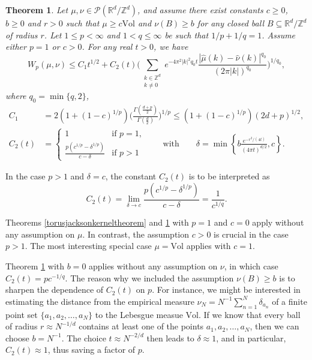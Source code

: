 \documentclass[11pt,a4paper]{article}
\newtheorem{thm}{Theorem}
\theoremstyle{definition}
\begin{document}
\begin{thm}\label{torusheatkerneltheorem} Let $\mu, \nu \in \mathcal{P}(\mathbb{R}^d / \mathbb{Z}^d)$, and assume there exist constants $c \ge 0$, $b \ge 0$ and $r>0$ such that $\mu \ge c \mathrm{Vol}$ and $\nu (B) \ge b$ for any closed ball $B \subseteq \mathbb{R}^d / \mathbb{Z}^d$ of radius $r$. Let $1 \le p < \infty$ and $1<q \le \infty$ be such that $1/p+1/q=1$. Assume either $p=1$ or $c>0$. For any real $t>0$, we have
\[ W_p (\mu, \nu) \le C_1 t^{1/2} + C_2(t) \Bigg( \sum_{\substack{k \in \mathbb{Z}^d \\ k \neq 0}} e^{-4 \pi^2 |k|^2  q_0 t} \frac{|\widehat{\mu}(k) - \widehat{\nu}(k)|^{q_0}}{(2 \pi |k|)^{q_0}} \Bigg)^{1/q_0} , \]
where $q_0=\min \{ q, 2 \}$,
\[ \begin{split} C_1 &= 2 (1+(1-c)^{1/p}) \Bigg( \frac{\Gamma \left( \frac{d+p}{2} \right)}{\Gamma \left( \frac{d}{2} \right)} \Bigg)^{1/p} \le (1+(1-c)^{1/p}) (2d+p)^{1/2}, \\ C_2(t) &=\left\{ \begin{array}{ll} 1 & \textrm{if } p=1, \\ \frac{p(c^{1/p}-\delta^{1/p})}{c-\delta} & \textrm{if } p>1 \end{array} \right. \qquad \textrm{with} \qquad \delta=\min \left\{ b \frac{e^{-r^2/(4t)}}{(4 \pi t)^{d/2}}, c \right\} . \end{split} \]
\end{thm}
\noindent In the case $p>1$ and $\delta=c$, the constant $C_2(t)$ is to be interpreted as
\[ C_2(t)=\lim_{\delta \to c} \frac{p(c^{1/p}-\delta^{1/p})}{c-\delta} = \frac{1}{c^{1/q}} . \]

Theorems \ref{torusjacksonkerneltheorem} and \ref{torusheatkerneltheorem} with $p=1$ and $c=0$ apply without any assumption on $\mu$. In contrast, the assumption $c>0$ is crucial in the case $p>1$. The most interesting special case $\mu = \mathrm{Vol}$ applies with $c=1$.

Theorem \ref{torusheatkerneltheorem} with $b=0$ applies without any assumption on $\nu$, in which case $C_2(t)=p c^{-1/q}$. The reason why we included the assumption $\nu (B) \ge b$ is to sharpen the dependence of $C_2(t)$ on $p$. For instance, we might be interested in estimating the distance from the empirical measure $\nu_N=N^{-1} \sum_{n=1}^N \delta_{a_n}$ of a finite point set $\{ a_1, a_2, \ldots, a_N \}$ to the Lebesgue measue $\mathrm{Vol}$. If we know that every ball of radius $r \approx N^{-1/d}$ contains at least one of the points $a_1, a_2, \ldots, a_N$, then we can choose $b=N^{-1}$. The choice $t \approx N^{-2/d}$ then leads to $\delta \approx 1$, and in particular, $C_2(t) \approx 1$, thus saving a factor of $p$.
\end{document}
